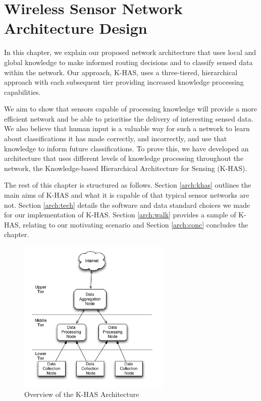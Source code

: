 \chapter{Wireless Sensor Network Architecture Design}\label{chap:arch}
	In this chapter, we explain our proposed network architecture that uses local and global knowledge to make informed routing decisions and to classify sensed data within the network. Our approach, K-HAS, uses a three-tiered, hierarchical approach with each subsequent tier providing increased knowledge processing capabilities. 

	We aim to show that sensors capable of processing knowledge will provide a more efficient network and be able to prioritise the delivery of interesting sensed data. We also believe that human input is a valuable way for such a network to learn about classifications it has made correctly, and incorrectly, and use that knowledge to inform future classifications. To prove this, we have developed an architecture that uses different levels of knowledge processing throughout the network, the Knowledge-based Hierarchical Architecture for Sensing (K-HAS).

	The rest of this chapter is structured as follows. Section \ref{arch:khas} outlines the main aims of K-HAS and what it is capable of that typical sensor networks are not. Section \ref{arch:tech} details the software and data standard choices we made for our implementation of K-HAS. Section \ref{arch:walk} provides a sample \DIFdelbegin {}\DIFdelend \DIFaddbegin {}\DIFaddend of K-HAS, relating to our motivating scenario and Section \ref{arch:conc} concludes the chapter.

	\begin{figure}[h]
			\centering
			\includegraphics[width=0.65\textwidth]{Chap4/figures/khasarch} 
			\caption{Overview of the K-HAS Architecture}
			\label{arch:khas:arch}
			\end{figure}


